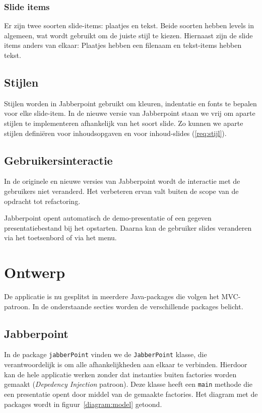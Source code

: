 \documentclass[a4paper]{article}
\newcommand{\reqref}[1]{\ref{req:#1}}
\newcommand{\code}[1]{\lstinline[columns=fixed]{#1}}
\begin{document}
		\subsubsection{Slide items}
			Er zijn twee soorten slide-items: plaatjes en tekst.
			Beide soorten hebben levels in algemeen, wat wordt gebruikt om de juiste stijl te kiezen.
			Hiernaast zijn de slide items anders van elkaar: Plaatjes hebben een filenaam en tekst-items hebben tekst.

		\subsection{Stijlen}
			Stijlen worden in Jabberpoint gebruikt om kleuren, indentatie en fonts te bepalen voor elke slide-item.
			In de nieuwe versie van Jabberpoint staan we vrij om aparte stijlen te implementeren afhankelijk van het soort slide.
			Zo kunnen we aparte stijlen definiëren voor inhoudsopgaven en voor inhoud-slides (\reqref{stijl}).

	\subsection{Gebruikersinteractie}\label{sec:control-analyse}
		In de originele en nieuwe versies van Jabberpoint wordt de interactie met de gebruikers niet veranderd.
		Het verbeteren ervan valt buiten de scope van de opdracht tot refactoring.

		Jabberpoint opent automatisch de demo-presentatie of een gegeven presentatiebestand bij het opstarten.
		Daarna kan de gebruiker slides veranderen via het toetsenbord of via het menu.

\section{Ontwerp}\label{sec:ontwerp}
	De applicatie is nu gesplitst in meerdere Java-packages die volgen het MVC-patroon.
	In de onderstaande secties worden de verschillende packages belicht.

	\subsection{Jabberpoint}
		In de package \code{jabberPoint} vinden we de \code{JabberPoint} klasse, die verantwoordelijk is om alle afhankelijkheden aan elkaar te verbinden.
		Hierdoor kan de hele applicatie werken zonder dat instanties buiten factories worden gemaakt (\textit{Depedency Injection} patroon).
		Deze klasse heeft een \code{main} methode die een presentatie opent door middel van de gemaakte factories.
		Het diagram met de packages wordt in figuur~\ref{diagram:model} getoond.
\end{document}
